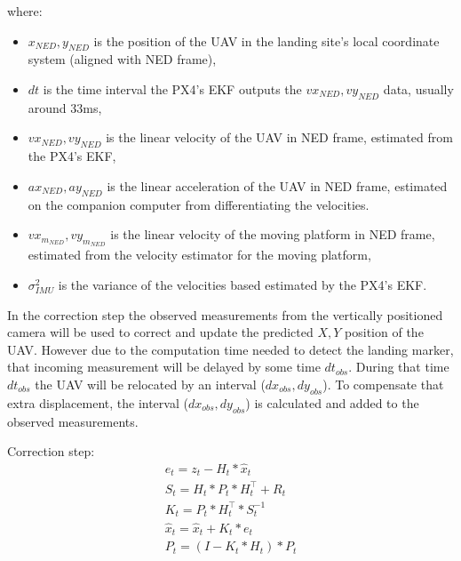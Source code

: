 \documentclass[conference]{IEEEtran}
\begin{document}
where:
\begin{itemize}
\item  \(x_{NED}, y_{NED} \) is the position of the UAV in the landing site's local coordinate system (aligned with NED frame), 
\item \(dt\) is the time interval the PX4's EKF outputs the \(vx_{NED},vy_{NED}\) data, usually around 33ms, 
\item \(vx_{NED},vy_{NED}\) is the linear velocity of the UAV in NED frame, estimated from the PX4's EKF,
\item \(ax_{NED}, ay_{NED}\) is the linear acceleration of the UAV in NED frame, estimated on the companion computer from differentiating the velocities.
\item \(vx_{m_{NED}},vy_{m_{NED}}\) is the linear velocity of the moving platform in NED frame, estimated from the velocity estimator for the moving platform,
\item \(\sigma^{2}_{IMU}\) is the variance of the velocities based estimated by the PX4's EKF.
\end{itemize}

In the correction step the observed measurements from the vertically
positioned camera will be used to correct and update the predicted
\(X,Y\) position of the UAV. However due to the computation time
needed to detect the landing marker, that incoming measurement will be
delayed by some time \(dt_{obs}\). During that time \(dt_{obs}\) the
UAV will be relocated by an interval (\(dx_{obs},dy_{obs}\)). To
compensate that extra displacement, the interval
(\(dx_{obs},dy_{obs}\)) is calculated and added to the observed
measurements.

Correction step:
\begin{equation}
    \begin{array}{l}
    
    e_{t} = z_{t} - H_{t}*\hat{x}_{t} \\
    S_{t} = H_{t}*P_{t}*H_{t}^\top + R_{t} \\
    K_{t} = P_{t}*H_{t}^\top * S_{t}^{-1} \\
    \hat{x}_{t} = \hat{x}_{t} + K_{t} * e_{t} \\
    P_{t} = (I - K_{t}*H_{t}) * P_{t}
    \end{array}
\end{equation}
\end{document}
